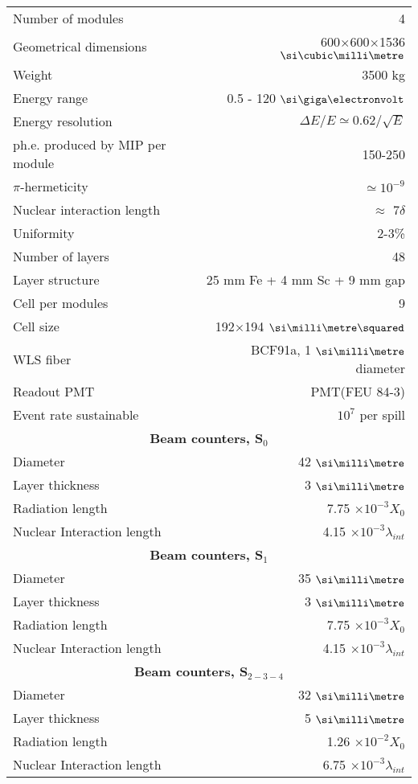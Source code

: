 \begin{longtable}{|l|r|}
  \hline
  Number of modules & 4 \\
  Geometrical dimensions & 600$\times$600$\times$1536 $\mmc$ \\
  Weight & 3500 \si{\kilo\gram} \\
  Energy range & 0.5 - 120 $\gev$ \\
  Energy resolution & $\Delta E / E \simeq 0.62 / \sqrt{E}$ \\
  ph.e. produced by MIP per module & 150-250 \\
  $\pi$-hermeticity & $\simeq 10^{-9}$ \\
  Nuclear interaction length & $\approx$ 7$\delta$ \\
  Uniformity & 2-3\% \\
  Number of layers & 48 \\
  Layer structure & 25 mm Fe + 4 mm Sc + 9 mm gap\\
  Cell per modules & 9 \\
  Cell size & 192$\times$194 $\mms$ \\
  WLS fiber & BCF91a, 1 $\mmi$ diameter \\
  Readout PMT & PMT(FEU 84-3) \\
  Event rate sustainable & $10^{7}$ per spill \\
  \hline
  \multicolumn{2}{|c|}{\textbf{Beam counters, S$_{0}$}}\\
  \hline
  Diameter & 42 $\mmi$ \\
  Layer thickness & 3 $\mmi$ \\
  Radiation length & 7.75 $\times10^{-3} X_0$ \\
  Nuclear Interaction length & 4.15 $\times 10^{-3} \lambda_{int}$ \\
  \hline
  \multicolumn{2}{|c|}{\textbf{Beam counters, S$_{1}$}}\\
  \hline
  Diameter & 35 $\mmi$ \\
  Layer thickness & 3 $\mmi$ \\
  Radiation length & 7.75 $\times10^{-3} X_0$ \\
  Nuclear Interaction length & 4.15 $\times 10^{-3} \lambda_{int}$ \\
  \hline
  \multicolumn{2}{|c|}{\textbf{Beam counters, S$_{2-3-4}$}}\\
  \hline
  Diameter & 32 $\mmi$ \\
  Layer thickness & 5 $\mmi$ \\
  Radiation length & 1.26 $\times10^{-2} X_0$ \\
  Nuclear Interaction length & 6.75 $\times 10^{-3} \lambda_{int}$ \\

\end{longtable}
